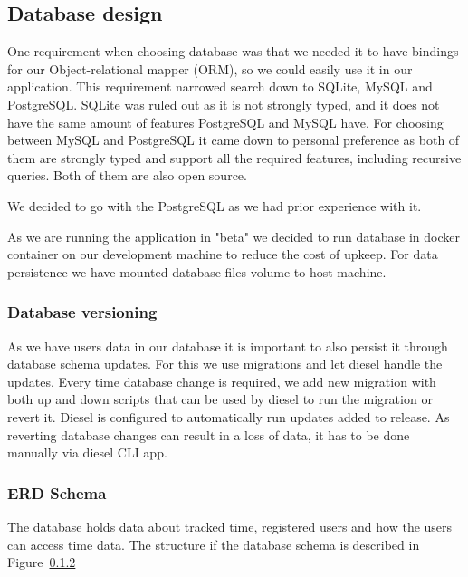 \subsection{Database design}\label{subsec:database-design}
One requirement when choosing database was that we needed it to have bindings for our Object-relational mapper (ORM),
so we could easily use it in our application.
This requirement narrowed search down to SQLite, MySQL and PostgreSQL.
SQLite was ruled out as it is not strongly typed, and it does not have the same amount of features PostgreSQL and MySQL have.
For choosing between MySQL and PostgreSQL it came down to personal preference as both of them are strongly typed and
support all the required features, including recursive queries.
Both of them are also open source.

We decided to go with the PostgreSQL as we had prior experience with it.

As we are running the application in "beta" we decided to run database in docker container on our development machine to
reduce the cost of upkeep.
For data persistence we have mounted database files volume to host machine.

\subsubsection{Database versioning}\label{subsubsec:database-versioning}
As we have users data in our database it is important to also persist it through database schema updates.
For this we use migrations and let diesel handle the updates.
Every time database change is required, we add new migration with both up and down scripts that can be used by diesel
to run the migration or revert it.
Diesel is configured to automatically run updates added to release.
As reverting database changes can result in a loss of data, it has to be done manually via diesel CLI app.

\subsubsection{ERD Schema}\label{subsubsec:erd-schema}
The database holds data about tracked time, registered users and how the users can access time data.
The structure if the database schema is described in Figure~\ref{subsubsec:erd-schema}

